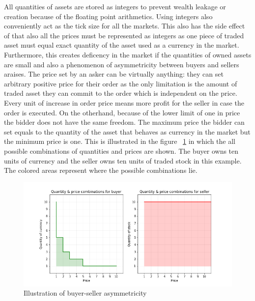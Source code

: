 All quantities of assets are stored as integers to prevent wealth leakage
or creation because of the floating point arithmetics. Using integers also
conveniently act as the tick size for all the markets. This also has the side effect
of that also all the prices must be represented as integers as one piece
of traded asset must equal exact quantity of the asset used as a currency
in the market. Furthermore, this creates deficency in the market if the quantities
of owned assets are small and also a phenomenon of asymmetricity between buyers and sellers
araises. The price set by an asker can be virtually anything: they can set
arbitrary positive price for their order as the only limitation is the amount
of traded asset they can commit to the order which is independent on the price. 
Every unit of increase in order price means more profit for the seller
in case the order is executed. On the otherhand, because of the 
lower limit of one in price the bidder does not have the same freedom.
The maximum price the bidder can set equals to the quantity of the asset
that behaves as currency in the market but the minimum price is one. This is
illustrated in the figure ~\ref{fig:buy_sell_asym} in which the all possible
combinations of quantities and prices are shown. The buyer owns
ten units of currency and the seller owns ten units of traded stock in
this example. The colored areas represent where the possible combinations
lie.

 \begin{figure}
    \includegraphics[width=\linewidth]{plots/buyer_seller_asymmetricity.png}
    \caption{Illustration of buyer-seller asymmetricity}
    \label{fig:buy_sell_asym}
\end{figure}